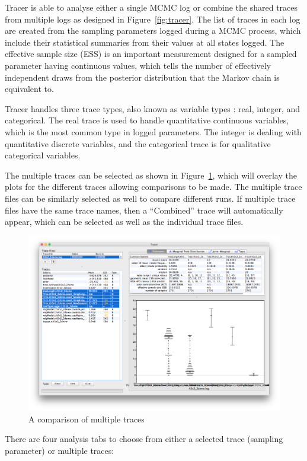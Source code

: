 \documentclass{bioinfo}
\begin{document}
Tracer is able to analyse either a single MCMC log or combine the shared traces from multiple logs as designed in Figure~\ref{fig:tracer}.
The list of traces in each log are created from the sampling parameters logged during a MCMC process, which include their statistical summaries from their values at all states logged.
The effective sample size (ESS) is an important measurement designed for a sampled parameter having continuous values, which tells the number of effectively independent draws from the posterior distribution that the Markov chain is equivalent to.

Tracer handles three trace types, also known as variable types \citep{mendenhall2012introduction}: real, integer, and categorical.
The real trace is used to handle quantitative continuous variables, which is the most common type in logged parameters.
The integer is dealing with quantitative discrete variables, and the categorical trace is for qualitative categorical variables.

The multiple traces can be selected as shown in Figure~\ref{fig:multitrace}, which will overlay the plots for the different traces allowing comparisons to be made. The multiple trace files can be similarly selected as well to compare different runs. If multiple trace files have the same trace names,  then a ``Combined'' trace will automatically appear, which can be selected as well as the individual trace files.

\begin{figure}[ht]
\includegraphics[width=.5\textwidth]{./figures/multitrace.png}
\caption{A comparison of multiple traces}
\label{fig:multitrace}
\end{figure}

There are four analysis tabs to choose from either a selected trace (sampling parameter) or multiple traces:
\end{document}
